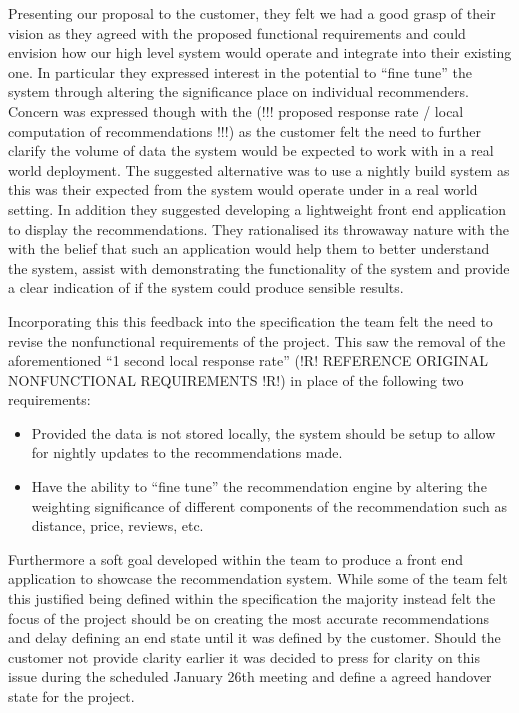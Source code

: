 \documentclass{l3proj}
\begin{document}
Presenting our proposal to the customer, they felt we had a good grasp of their vision as they agreed with the proposed functional requirements and could envision how our high level system would operate and integrate into their existing one. In particular they expressed interest in the potential to “fine tune” the system through altering the significance place on individual recommenders. Concern was expressed though with the (!!! proposed response rate / local computation of recommendations !!!) as the customer felt the need to further clarify the volume of data the system would be expected to work with in a real world deployment. The suggested alternative was to use a nightly build system as this was their expected from the system would operate under in a real world setting. In addition they suggested developing a lightweight front end application to display the recommendations. They rationalised its throwaway nature with the with the belief that such an application would help them to better understand the system, assist with demonstrating the functionality of the system and provide a clear indication of if the system could produce sensible results. 

Incorporating this this feedback into the specification  the team felt the need to revise the nonfunctional requirements of the project. This saw the removal of the aforementioned “1 second local response rate” (!R! REFERENCE ORIGINAL NONFUNCTIONAL REQUIREMENTS !R!) in place of the following two requirements:

\begin{itemize}
\item Provided the data is not stored locally, the system should be setup to allow for nightly updates to the recommendations made.
\item Have the ability to “fine tune” the recommendation engine by altering the weighting significance of different components of the recommendation such as distance, price, 
reviews, etc.
\end{itemize}

Furthermore a soft goal developed within the team to produce a front end application to showcase the recommendation system. While some of the team felt this justified being defined within the specification the majority instead felt the focus of the project should be on creating the most accurate recommendations and delay defining an end state until it was defined by the customer. Should the customer not provide clarity earlier it was decided to press for clarity on this issue during the scheduled January 26th meeting and define a agreed handover state for the project.
\end{document}
